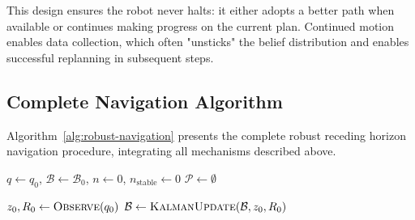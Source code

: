 This design ensures the robot never halts: it either adopts a better path when available or continues making progress on the current plan. Continued motion enables data collection, which often "unsticks" the belief distribution and enables successful replanning in subsequent steps.

\subsection{Complete Navigation Algorithm}

Algorithm~\ref{alg:robust-navigation} presents the complete robust receding horizon navigation procedure, integrating all mechanisms described above.

\begin{algorithm}[H]
\caption{Robust Receding Horizon Navigation with Event-Triggered Replanning}
\label{alg:robust-navigation}
\DontPrintSemicolon
{}


$q \leftarrow q_0$, $\mathcal{B} \leftarrow \mathcal{B}_0$, $n \leftarrow 0$, $n_{\text{stable}} \leftarrow 0$\;
$\mathcal{P} \leftarrow \emptyset$ 

$z_0, R_0 \leftarrow \textsc{Observe}(q_0)$\;
$\mathcal{B} \leftarrow \textsc{KalmanUpdate}(\mathcal{B}, z_0, R_0)$\;

\end{algorithm}
